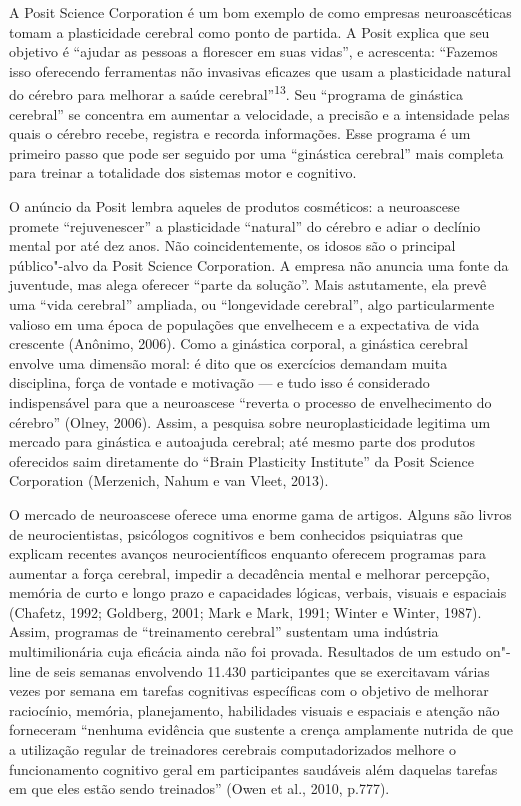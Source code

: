 A Posit Science Corporation é um bom exemplo de como empresas
neuroascéticas tomam a plasticidade cerebral como ponto de partida. A
Posit explica que seu objetivo é ``ajudar as pessoas a florescer em suas
vidas'', e acrescenta: ``Fazemos isso oferecendo ferramentas não
invasivas eficazes que usam a plasticidade natural do cérebro para
melhorar a saúde cerebral''\textsuperscript{13}. Seu ``programa de
ginástica cerebral'' se concentra em aumentar a velocidade, a precisão e
a intensidade pelas quais o cérebro recebe, registra e recorda
informações. Esse programa é um primeiro passo que pode ser seguido por
uma ``ginástica cerebral'' mais completa para treinar a totalidade dos
sistemas motor e cognitivo.

O anúncio da Posit lembra aqueles de produtos cosméticos: a neuroascese
promete ``rejuvenescer'' a plasticidade ``natural'' do cérebro e adiar o
declínio mental por até dez anos. Não coincidentemente, os idosos são o
principal público"-alvo da Posit Science Corporation. A empresa não
anuncia uma fonte da juventude, mas alega oferecer ``parte da solução''.
Mais astutamente, ela prevê uma ``vida cerebral'' ampliada, ou
``longevidade cerebral'', algo particularmente valioso em uma época de
populações que envelhecem e a expectativa de vida crescente (Anônimo,
2006). Como a ginástica corporal, a ginástica cerebral envolve uma
dimensão moral: é dito que os exercícios demandam muita disciplina,
força de vontade e motivação --- e tudo isso é considerado indispensável
para que a neuroascese ``reverta o processo de envelhecimento do
cérebro'' (Olney, 2006). Assim, a pesquisa sobre neuroplasticidade
legitima um mercado para ginástica e autoajuda cerebral; até mesmo parte
dos produtos oferecidos saim diretamente do ``Brain Plasticity
Institute'' da Posit Science Corporation (Merzenich, Nahum e van Vleet,
2013).

O mercado de neuroascese oferece uma enorme gama de artigos. Alguns são
livros de neurocientistas, psicólogos cognitivos e bem conhecidos
psiquiatras que explicam recentes avanços neurocientíficos enquanto
oferecem programas para aumentar a força cerebral, impedir a decadência
mental e melhorar percepção, memória de curto e longo prazo e
capacidades lógicas, verbais, visuais e espaciais (Chafetz, 1992;
Goldberg, 2001; Mark e Mark, 1991; Winter e Winter, 1987). Assim,
programas de ``treinamento cerebral'' sustentam uma indústria
multimilionária cuja eficácia ainda não foi provada. Resultados de um
estudo on"-line de seis semanas envolvendo 11.430 participantes que se
exercitavam várias vezes por semana em tarefas cognitivas específicas
com o objetivo de melhorar raciocínio, memória, planejamento,
habilidades visuais e espaciais e atenção não forneceram ``nenhuma
evidência que sustente a crença amplamente nutrida de que a utilização
regular de treinadores cerebrais computadorizados melhore o
funcionamento cognitivo geral em participantes saudáveis além daquelas
tarefas em que eles estão sendo treinados'' (Owen et al., 2010, p.777).

